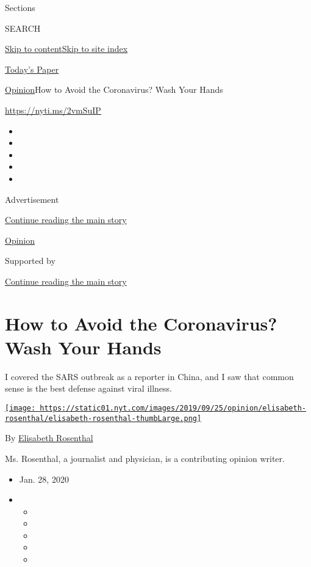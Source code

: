Sections

SEARCH

\protect\hyperlink{site-content}{Skip to
content}\protect\hyperlink{site-index}{Skip to site index}

\href{https://myaccount.nytimes.com/auth/login?response_type=cookie\&client_id=vi}{}

\href{https://www.nytimes.com/section/todayspaper}{Today's Paper}

\href{/section/opinion}{Opinion}\textbar{}How to Avoid the Coronavirus?
Wash Your Hands

\url{https://nyti.ms/2vmSuIP}

\begin{itemize}
\item
\item
\item
\item
\item
\end{itemize}

Advertisement

\protect\hyperlink{after-top}{Continue reading the main story}

\href{/section/opinion}{Opinion}

Supported by

\protect\hyperlink{after-sponsor}{Continue reading the main story}

\hypertarget{how-to-avoid-the-coronavirus-wash-your-hands}{%
\section{How to Avoid the Coronavirus? Wash Your
Hands}\label{how-to-avoid-the-coronavirus-wash-your-hands}}

I covered the SARS outbreak as a reporter in China, and I saw that
common sense is the best defense against viral illness.

\href{https://www.nytimes.com/by/elisabeth-rosenthal}{\texttt{[image: https://static01.nyt.com/images/2019/09/25/opinion/elisabeth-rosenthal/elisabeth-rosenthal-thumbLarge.png]}}

By \href{https://www.nytimes.com/by/elisabeth-rosenthal}{Elisabeth
Rosenthal}

Ms. Rosenthal, a journalist and physician, is a contributing opinion
writer.

\begin{itemize}
\item
  Jan. 28, 2020
\item
  \begin{itemize}
  \item
  \item
  \item
  \item
  \item
  \end{itemize}
\end{itemize}

